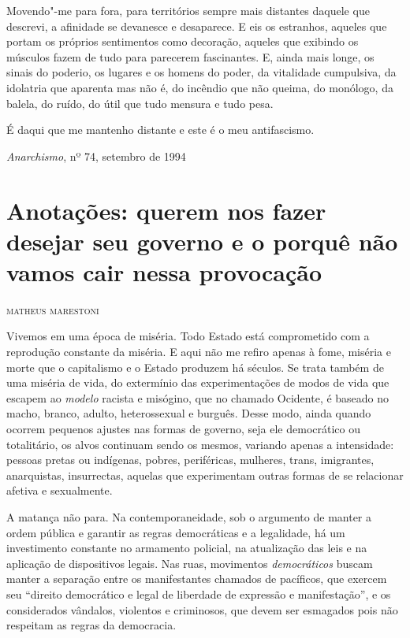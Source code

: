Movendo"-me para fora, para territórios sempre mais distantes daquele que
descrevi, a afinidade se devanesce e desaparece. E eis os estranhos,
aqueles que portam os próprios sentimentos como decoração, aqueles que
exibindo os músculos fazem de tudo para parecerem fascinantes. E, ainda
mais longe, os sinais do poderio, os lugares e os homens do poder, da
vitalidade cumpulsiva, da idolatria que aparenta mas não é, do incêndio
que não queima, do monólogo, da balela, do ruído, do útil que tudo
mensura e tudo pesa.

É daqui que me mantenho distante e este é o meu antifascismo.

\hfill{}\emph{Anarchismo}, nº 74, setembro de 1994

\chapter[Anotações: querem nos fazer desejar seu governo\\ e o porquê não vamos cair nessa provocação \medskip]{Anotações: querem nos fazer desejar seu governo e o porquê não vamos cair nessa provocação}

\hfill{}\textsc{matheus marestoni}

\bigskip

Vivemos em uma época de miséria. Todo Estado está comprometido com a
reprodução constante da miséria. E aqui não me refiro apenas à fome,
miséria e morte que o capitalismo e o Estado produzem há séculos. Se
trata também de uma miséria de vida, do extermínio das experimentações
de modos de vida que escapem ao \emph{modelo} racista e misógino, que no
chamado Ocidente, é baseado no macho, branco, adulto, heterossexual e
burguês. Desse modo, ainda quando ocorrem pequenos ajustes nas formas de
governo, seja ele democrático ou totalitário, os alvos continuam sendo
os mesmos, variando apenas a intensidade: pessoas pretas ou indígenas,
pobres, periféricas, mulheres, trans, imigrantes, anarquistas,
insurrectas, aquelas que experimentam outras formas de se relacionar
afetiva e sexualmente.

A matança não para. Na contemporaneidade, sob o argumento de manter a
ordem pública e garantir as regras democráticas e a legalidade, há um
investimento constante no armamento policial, na atualização das leis e
na aplicação de dispositivos legais. Nas ruas, movimentos
\emph{democráticos} buscam manter a separação entre os manifestantes
chamados de pacíficos, que exercem seu ``direito democrático e legal de
liberdade de expressão e manifestação'', e os considerados vândalos,
violentos e criminosos, que devem ser esmagados pois não respeitam as
regras da democracia.

